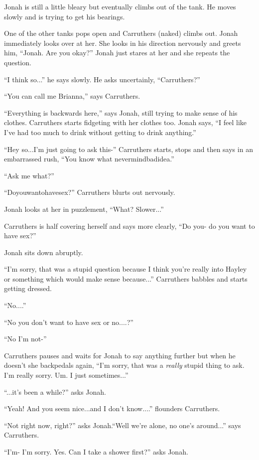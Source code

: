 Jonah is still a little bleary but eventually climbs out of the tank.  He moves slowly and is trying to get his bearings.

One of the other tanks pops open and Carruthers (naked) climbs out.  Jonah immediately looks over at her.  She looks in his direction nervously and greets him, ``Jonah.  Are you okay?''   Jonah just stares at her and she repeats the question. 

``I think so...'' he says slowly.  He asks uncertainly, ``Carruthers?''

``You can call me Brianna,'' says Carruthers.

``Everything is backwards here,'' says Jonah, still trying to make sense of his clothes.  Carruthers starts fidgeting with her clothes too. Jonah says, ``I feel like I've had too much to drink without getting to drink anything.'' 

``Hey so...I'm just going to ask this-'' Carruthers starts, stops and then says in an embarrassed rush, ``You know what nevermindbadidea.''

``Ask me what?''

``Doyouwantohavesex?'' Carruthers blurts out nervously.

Jonah looks at her in puzzlement, ``What?  Slower...''

Carruthers is half covering herself and says more clearly, ``Do you- do you want to have sex?''

Jonah sits down abruptly.

``I'm sorry, that was a stupid question because I think you're really into Hayley or something which would make sense because...'' Carruthers babbles and starts getting dressed.

``No....''

``No you don't want to have sex or no....?''

``No I'm not-''

Carruthers pauses and waits for Jonah to say anything further but when he doesn't she backpedals again, ``I'm sorry, that was a \textit{really} stupid thing to ask.  I'm really sorry.  Um.  I just sometimes...''

``...it's been a while?'' asks Jonah.

``Yeah!   And you seem nice...and I don't know....'' flounders Carruthers.

``Not right now, right?'' asks Jonah.``Well we're alone, no one's around...'' says Carruthers.

``I'm- I'm sorry.  Yes.  Can I take a shower first?'' asks Jonah.

